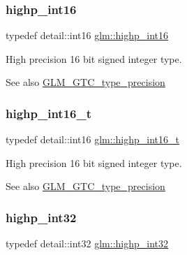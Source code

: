 \subsubsection{\texorpdfstring{highp\+\_\+int16}{highp\_int16}}
{\footnotesize\ttfamily typedef detail\+::int16 \hyperlink{group__gtc__type__precision_gaf0430ed80e88c0d1dfbe47f359659c81}{glm\+::highp\+\_\+int16}}

High precision 16 bit signed integer type. \begin{DoxySeeAlso}{See also}
\hyperlink{group__gtc__type__precision}{G\+L\+M\+\_\+\+G\+T\+C\+\_\+type\+\_\+precision} 
\end{DoxySeeAlso}
\mbox{\label{group__gtc__type__precision_ga07d318d61472e75238e53b9642227672}} 
\subsubsection{\texorpdfstring{highp\+\_\+int16\+\_\+t}{highp\_int16\_t}}
{\footnotesize\ttfamily typedef detail\+::int16 \hyperlink{group__gtc__type__precision_ga07d318d61472e75238e53b9642227672}{glm\+::highp\+\_\+int16\+\_\+t}}

High precision 16 bit signed integer type. \begin{DoxySeeAlso}{See also}
\hyperlink{group__gtc__type__precision}{G\+L\+M\+\_\+\+G\+T\+C\+\_\+type\+\_\+precision} 
\end{DoxySeeAlso}
\mbox{\label{group__gtc__type__precision_gaa2045c92b9553d463191af6a20e997bb}} 
\subsubsection{\texorpdfstring{highp\+\_\+int32}{highp\_int32}}
{\footnotesize\ttfamily typedef detail\+::int32 \hyperlink{group__gtc__type__precision_gaa2045c92b9553d463191af6a20e997bb}{glm\+::highp\+\_\+int32}}

